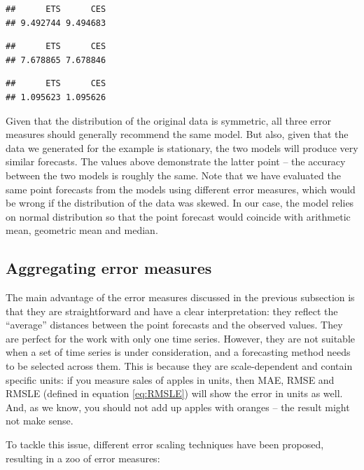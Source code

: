 \documentclass[
]{book}
\theoremstyle{definition}
\theoremstyle{definition}
\theoremstyle{definition}
\theoremstyle{definition}
\theoremstyle{remark}
\begin{document}
\begin{verbatim}
##      ETS      CES 
## 9.492744 9.494683
\end{verbatim}

\begin{verbatim}
##      ETS      CES 
## 7.678865 7.678846
\end{verbatim}

\begin{verbatim}
##      ETS      CES 
## 1.095623 1.095626
\end{verbatim}

Given that the distribution of the original data is symmetric, all three error measures should generally recommend the same model. But also, given that the data we generated for the example is stationary, the two models will produce very similar forecasts. The values above demonstrate the latter point -- the accuracy between the two models is roughly the same. Note that we have evaluated the same point forecasts from the models using different error measures, which would be wrong if the distribution of the data was skewed. In our case, the model relies on normal distribution so that the point forecast would coincide with arithmetic mean, geometric mean and median.

\hypertarget{errorMeasuresAggregate}{%
\subsection{Aggregating error measures}\label{errorMeasuresAggregate}}

The main advantage of the error measures discussed in the previous subsection is that they are straightforward and have a clear interpretation: they reflect the ``average'' distances between the point forecasts and the observed values. They are perfect for the work with only one time series. However, they are not suitable when a set of time series is under consideration, and a forecasting method needs to be selected across them. This is because they are scale-dependent and contain specific units: if you measure sales of apples in units, then MAE, RMSE and RMSLE (defined in equation \eqref{eq:RMSLE}) will show the error in units as well. And, as we know, you should not add up apples with oranges -- the result might not make sense.

To tackle this issue, different error scaling techniques have been proposed, resulting in a zoo of error measures:
\end{document}
